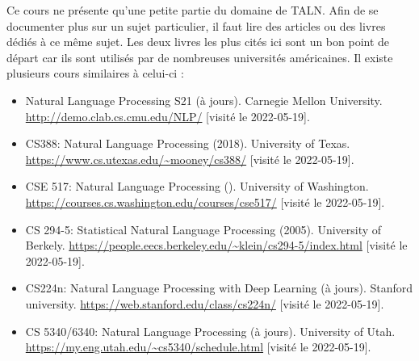 \documentclass{KodeBook}
\begin{document}
Ce cours ne présente qu'une petite partie du domaine de TALN.
Afin de se documenter plus sur un sujet particulier, il faut lire des articles ou des livres dédiés à ce même sujet.
Les deux livres les plus cités ici \cite{2020-jurafsky-martin,2018-eisenstein} sont un bon point de départ car ils sont utilisés par de nombreuses universités américaines.
Il existe plusieurs cours similaires à celui-ci :
\begin{itemize}
	
	\item Natural Language Processing S21 (à jours).
	Carnegie Mellon University. 
	\url{http://demo.clab.cs.cmu.edu/NLP/} [visité le 2022-05-19].
	
	\item CS388: Natural Language Processing (2018). 
	University of Texas. 
	\url{https://www.cs.utexas.edu/~mooney/cs388/} [visité le 2022-05-19].
	
	\item CSE 517: Natural Language Processing ().
	University of Washington.
	\url{https://courses.cs.washington.edu/courses/cse517/} [visité le 2022-05-19].
	
	\item CS 294-5: Statistical Natural Language Processing (2005). 
	University of Berkely. 
	\url{https://people.eecs.berkeley.edu/~klein/cs294-5/index.html} [visité le 2022-05-19].
	
	\item CS224n: Natural Language Processing with Deep Learning (à jours).
	Stanford university.
	\url{https://web.stanford.edu/class/cs224n/} [visité le 2022-05-19].
	
	\item CS 5340/6340: Natural Language Processing (à jours). 
	University of Utah.
	\url{https://my.eng.utah.edu/~cs5340/schedule.html} [visité le 2022-05-19].
	
\end{itemize}



\ifx\wholebook\relax\else
% 
% 
	
\end{document}
